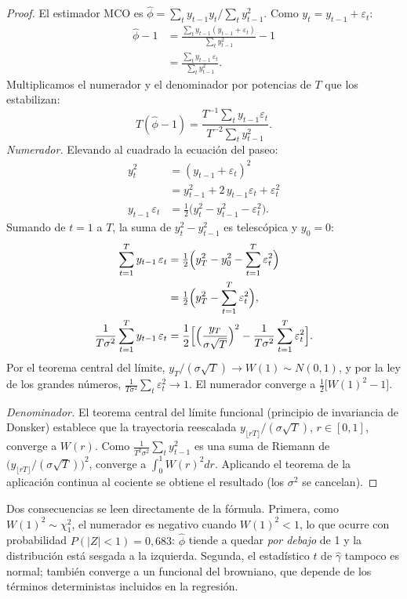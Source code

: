 \begin{proof}
El estimador MCO es $\hat\phi=\sum_ty_{t-1}y_t/\sum_ty_{t-1}^2$. Como $y_t=y_{t-1}+\varepsilon_t$:
\begin{align*}
  \hat\phi-1 &= \frac{\sum_ty_{t-1}(y_{t-1}+\varepsilon_t)}{\sum_ty_{t-1}^2}-1\\
             &= \frac{\sum_ty_{t-1}\,\varepsilon_t}{\sum_ty_{t-1}^2}.
\end{align*}
Multiplicamos el numerador y el denominador por potencias de $T$ que los estabilizan:
\[
  T(\hat\phi-1)=\frac{T^{-1}\sum_ty_{t-1}\varepsilon_t}{T^{-2}\sum_ty_{t-1}^2}.
\]
\emph{Numerador.} Elevando al cuadrado la ecuación del paseo:
\begin{align*}
  y_t^2                    &= (y_{t-1}+\varepsilon_t)^2\\
                           &= y_{t-1}^2+2\,y_{t-1}\varepsilon_t+\varepsilon_t^2\\
  y_{t-1}\,\varepsilon_t   &= \tfrac12\bigl(y_t^2-y_{t-1}^2-\varepsilon_t^2\bigr).
\end{align*}
Sumando de $t=1$ a $T$, la suma de $y_t^2-y_{t-1}^2$ es telescópica y $y_0=0$:
\begin{align*}
  \sum_{t=1}^Ty_{t-1}\,\varepsilon_t &= \tfrac12\Bigl(y_T^2-y_0^2-\sum_{t=1}^T\varepsilon_t^2\Bigr)\\
                                     &= \tfrac12\Bigl(y_T^2-\sum_{t=1}^T\varepsilon_t^2\Bigr),\\
  \frac1{T\sigma^2}\sum_{t=1}^Ty_{t-1}\,\varepsilon_t
                                     &= \frac12\Bigl[\Bigl(\frac{y_T}{\sigma\sqrt T}\Bigr)^2-\frac{1}{T\sigma^2}\sum_{t=1}^T\varepsilon_t^2\Bigr].
\end{align*}
Por el teorema central del límite, $y_T/(\sigma\sqrt T)\to W(1)\sim N(0,1)$, y por la ley de los grandes
números, $\frac1{T\sigma^2}\sum_t\varepsilon_t^2\to1$. El numerador converge a
$\tfrac12\bigl[W(1)^2-1\bigr]$.

\emph{Denominador.} El teorema central del límite funcional (principio de invariancia de Donsker) establece
que la trayectoria reescalada $y_{\lfloor rT\rfloor}/(\sigma\sqrt T)$, $r\in[0,1]$, converge a $W(r)$. Como
$\frac{1}{T^2\sigma^2}\sum_ty_{t-1}^2$ es una suma de Riemann de $\bigl(y_{\lfloor rT\rfloor}/(\sigma\sqrt T)\bigr)^2$,
converge a $\int_0^1W(r)^2dr$. Aplicando el teorema de la aplicación continua al cociente se obtiene el
resultado (los $\sigma^2$ se cancelan).
\end{proof}

Dos consecuencias se leen directamente de la fórmula. Primera, como $W(1)^2\sim\chi^2_1$, el numerador es
negativo cuando $W(1)^2<1$, lo que ocurre con probabilidad $P(|Z|<1)=0{,}683$: $\hat\phi$ tiende a quedar
\emph{por debajo} de 1 y la distribución está sesgada a la izquierda. Segunda, el estadístico $t$ de
$\hat\gamma$ tampoco es normal; también converge a un funcional del browniano, que depende de los términos
deterministas incluidos en la regresión.

